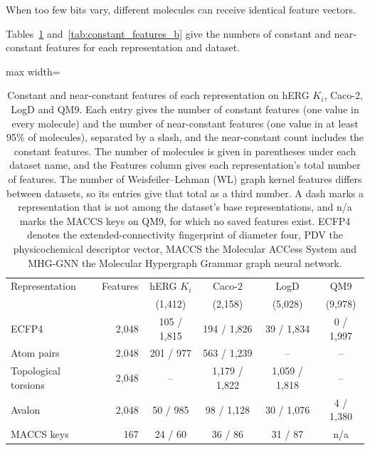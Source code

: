 When too few bits vary, different molecules can receive identical feature vectors.

Tables~\ref{tab:constant_features} and~\ref{tab:constant_features_b} give the numbers of constant and near-constant features for each representation and dataset.

\begin{table}[htbp]
\centering
\small
\setlength{\tabcolsep}{4pt}
\caption[Constant and near-constant features per representation, part 1.]{Constant and near-constant features of each representation on hERG $K_i$, Caco-2, LogD and QM9. Each entry gives the number of constant features (one value in every molecule) and the number of near-constant features (one value in at least 95\% of molecules), separated by a slash, and the near-constant count includes the constant features. The number of molecules is given in parentheses under each dataset name, and the Features column gives each representation's total number of features. The number of Weisfeiler--Lehman (WL) graph kernel features differs between datasets, so its entries give that total as a third number. A dash marks a representation that is not among the dataset's base representations, and n/a marks the MACCS keys on QM9, for which no saved features exist. ECFP4 denotes the extended-connectivity fingerprint of diameter four, PDV the physicochemical descriptor vector, MACCS the Molecular ACCess System and MHG-GNN the Molecular Hypergraph Grammar graph neural network.}
\label{tab:constant_features}
\begin{adjustbox}{max width=\textwidth}
\begin{tabular}{lrcccc}
\toprule
Representation & Features & hERG $K_i$ & Caco-2 & LogD & QM9 \\
 & & (1,412) & (2,158) & (5,028) & (9,978) \\
\midrule
ECFP4 & 2,048 & 105 / 1,815 & 194 / 1,826 & 39 / 1,834 & 0 / 1,997 \\
Atom pairs & 2,048 & 201 / 977 & 563 / 1,239 & -- & -- \\
Topological torsions & 2,048 & -- & 1,179 / 1,822 & 1,059 / 1,818 & -- \\
Avalon & 2,048 & 50 / 985 & 98 / 1,128 & 30 / 1,076 & 4 / 1,380 \\
MACCS keys & 167 & 24 / 60 & 36 / 86 & 31 / 87 & n/a \\

\end{tabular}
\end{adjustbox}
\end{table}
